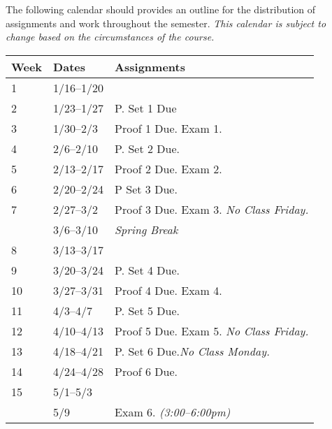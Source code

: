 \documentclass[10pt]{article}
\begin{document}
The following calendar should provides an outline for the distribution of assignments and work throughout the semester.  \textit{This calendar is subject to change based on the circumstances of the course.}
\begin{center}
\begin{tabular}{lll}
Week & Dates & Assignments \\ \toprule
1 & 1/16--1/20 &    \\
2 & 1/23--1/27 &  P. Set 1 Due \\
3 & 1/30--2/3 &   Proof 1 Due. Exam 1. \\
4 & 2/6--2/10 &   P. Set 2 Due. \\
5 & 2/13--2/17 & Proof 2 Due. Exam 2. \\
6 & 2/20--2/24 & P Set 3 Due.  \\
7 & 2/27--3/2 & Proof 3 Due. Exam 3. \textit{No Class Friday.} \\
 & 3/6--3/10 & \textit{Spring Break} \\
8 & 3/13--3/17 &  \\
9 & 3/20--3/24 &  P. Set 4 Due. \\
10 & 3/27--3/31 &  Proof 4 Due. Exam 4.  \\
11 & 4/3--4/7 &  P. Set 5 Due.  \\
12 & 4/10--4/13 & Proof 5 Due. Exam 5.  \textit{No Class Friday.}   \\
13 & 4/18--4/21 & P. Set 6 Due.\textit{No Class Monday.}  \\
14 & 4/24--4/28 & Proof 6 Due. \\
15 & 5/1--5/3 &   \\ \midrule
   & 5/9 & Exam 6.  \textit{(3:00--6:00pm)}  \\
\end{tabular}
\end{center}
\end{document}
